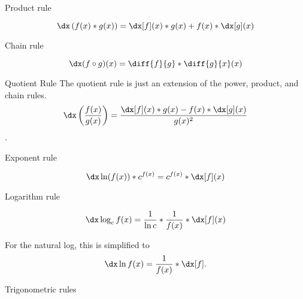 \begin{psec}{Product rule}\label{rule:derivative product}

    \begin{equation}\label{eq:derivative prod}
        \dx \left(f(x)*g(x)\right) = \dx[f](x) *  g(x) + f(x) *
        \dx[g](x)
    \end{equation}

\end{psec}

\begin{psec}{Chain rule}\label{rule:derivative chain}

    \begin{equation}\label{eq:derivative chain}
        \dx (f \circ g)(x) = \diff{f}{g} * \diff{g}{x}(x)
    \end{equation}

\end{psec}

\begin{psec}{Quotient Rule}\label{rule:derivative quotient} The quotient rule is just an extension of the
    power, product, and chain rules.
    \begin{equation}
        \dx \left(\frac{f(x)}{g(x)}\right) = \frac{\dx[f](x) * g(x) - f(x) * \dx[g](x)
        }{g(x)^2}
    \end{equation}.

\end{psec}

\begin{psec}{Exponent rule}\label{rule:derivative exponent}

    \begin{equation}
        \dx \ln(f(x)) * c ^ {f(x)} = c ^ {f(x)} * \dx[f](x)
    \end{equation}

\end{psec}

\begin{psec}{Logarithm rule}\label{rule:derivative log}

    \begin{equation}
        \dx \log_c f(x) = \frac{1}{\ln c} * \frac{1}{f(x)} * \dx[f] (x)
    \end{equation}

    For the natural log, this is simplified to 
    \begin{equation*}
        \dx \ln f(x) = \frac{1}{f(x)} * \dx[f].
    \end{equation*}

\end{psec}


\begin{psec}{Trigonometric rules}


\end{psec}
